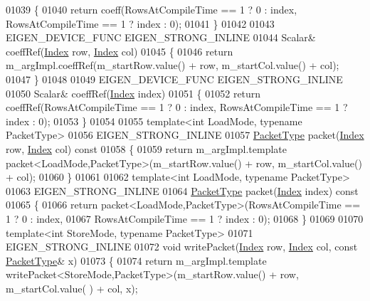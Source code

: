 \begin{DoxyCode}
01039 \textcolor{keyword}{  }\{ 
01040     \textcolor{keywordflow}{return} coeff(RowsAtCompileTime == 1 ? 0 : index, RowsAtCompileTime == 1 ? index : 0);
01041   \}
01042 
01043   EIGEN\_DEVICE\_FUNC EIGEN\_STRONG\_INLINE
01044   Scalar& coeffRef(\hyperlink{namespace_eigen_a62e77e0933482dafde8fe197d9a2cfde}{Index} row, \hyperlink{namespace_eigen_a62e77e0933482dafde8fe197d9a2cfde}{Index} col)
01045   \{ 
01046     \textcolor{keywordflow}{return} m\_argImpl.coeffRef(m\_startRow.value() + row, m\_startCol.value() + col); 
01047   \}
01048   
01049   EIGEN\_DEVICE\_FUNC EIGEN\_STRONG\_INLINE
01050   Scalar& coeffRef(\hyperlink{namespace_eigen_a62e77e0933482dafde8fe197d9a2cfde}{Index} index)
01051   \{ 
01052     \textcolor{keywordflow}{return} coeffRef(RowsAtCompileTime == 1 ? 0 : index, RowsAtCompileTime == 1 ? index : 0);
01053   \}
01054  
01055   \textcolor{keyword}{template}<\textcolor{keywordtype}{int} LoadMode, \textcolor{keyword}{typename} PacketType>
01056   EIGEN\_STRONG\_INLINE
01057   \hyperlink{struct_eigen_1_1_packet_type}{PacketType} packet(\hyperlink{namespace_eigen_a62e77e0933482dafde8fe197d9a2cfde}{Index} row, \hyperlink{namespace_eigen_a62e77e0933482dafde8fe197d9a2cfde}{Index} col)\textcolor{keyword}{ const }
01058 \textcolor{keyword}{  }\{ 
01059     \textcolor{keywordflow}{return} m\_argImpl.template packet<LoadMode,PacketType>(m\_startRow.value() + row, m\_startCol.value() + 
      col); 
01060   \}
01061 
01062   \textcolor{keyword}{template}<\textcolor{keywordtype}{int} LoadMode, \textcolor{keyword}{typename} PacketType>
01063   EIGEN\_STRONG\_INLINE
01064   \hyperlink{struct_eigen_1_1_packet_type}{PacketType} packet(\hyperlink{namespace_eigen_a62e77e0933482dafde8fe197d9a2cfde}{Index} index)\textcolor{keyword}{ const }
01065 \textcolor{keyword}{  }\{ 
01066     \textcolor{keywordflow}{return} packet<LoadMode,PacketType>(RowsAtCompileTime == 1 ? 0 : index,
01067                                        RowsAtCompileTime == 1 ? index : 0);
01068   \}
01069   
01070   \textcolor{keyword}{template}<\textcolor{keywordtype}{int} StoreMode, \textcolor{keyword}{typename} PacketType>
01071   EIGEN\_STRONG\_INLINE
01072   \textcolor{keywordtype}{void} writePacket(\hyperlink{namespace_eigen_a62e77e0933482dafde8fe197d9a2cfde}{Index} row, \hyperlink{namespace_eigen_a62e77e0933482dafde8fe197d9a2cfde}{Index} col, \textcolor{keyword}{const} \hyperlink{struct_eigen_1_1_packet_type}{PacketType}& x) 
01073   \{
01074     \textcolor{keywordflow}{return} m\_argImpl.template writePacket<StoreMode,PacketType>(m\_startRow.value() + row, m\_startCol.value(
      ) + col, x); 

\end{DoxyCode}
